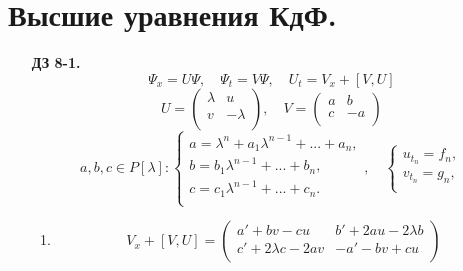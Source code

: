 \documentclass[12pt]{article}
\theoremstyle{definition}
\begin{document}
\section{Высшие уравнения КдФ.}
\begin{itemize}
    \item[\textbf{ДЗ 8-1.}] 
    \begin{equation}
        \Psi_x=U\Psi,\quad \Psi_t=V\Psi,\quad U_t=V_x+[V,U]
    \end{equation}
    \begin{equation}
        U=\left(
            \begin{array}{cc}
             \lambda & u\\
             v & -\lambda\\
        \end{array}\right),\quad V=\left(
            \begin{array}{cc}
             a & b\\
             c & -a\\
        \end{array}\right)
    \end{equation}
    \begin{equation}
        a,b,c\in P[\lambda]: \left\{
        \begin{array}{l}
        a=\lambda^n+a_1\lambda^{n-1}+...+a_n,\\
        b=b_1\lambda^{n-1}+...+b_n,\\
        c=c_1\lambda^{n-1}+...+c_n.\\
        \end{array}
        \right.,\quad \left\{
        \begin{array}{l}
        u_{t_n}=f_n,\\
        v_{t_n}=g_n,\\
        \end{array}
        \right.
    \end{equation}
    \begin{enumerate}
        \item 
        \begin{equation}
            V_x+[V,U]=\left(
            \begin{array}{cc}
             a'+bv-cu & b'+2au-2\lambda b\\
             c'+2\lambda c-2av & -a'-bv+cu\\
        \end{array}\right)
        \end{equation}
        \begin{equation}

\end{equation}
\end{enumerate}
\end{itemize}
\end{document}
